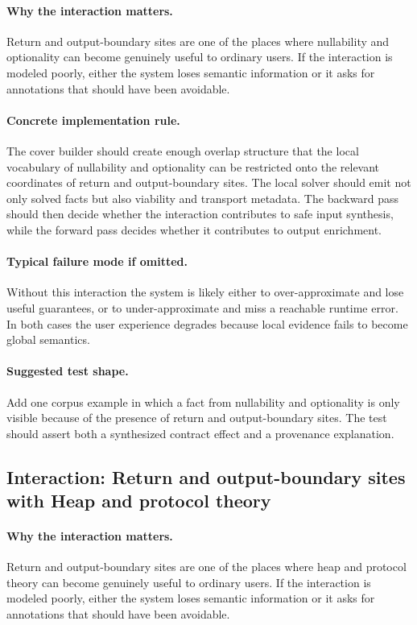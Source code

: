\documentclass[11pt]{report}
\theoremstyle{definition}
\theoremstyle{plain}
\begin{document}
\paragraph{Why the interaction matters.}
Return and output-boundary sites are one of the places where nullability and optionality can become
genuinely useful to ordinary users. If the interaction is modeled poorly,
either the system loses semantic information or it asks for annotations that
should have been avoidable.

\paragraph{Concrete implementation rule.}
The cover builder should create enough overlap structure that the local
vocabulary of nullability and optionality can be restricted onto the relevant
coordinates of return and output-boundary sites. The local solver should emit not only
solved facts but also viability and transport metadata. The backward pass
should then decide whether the interaction contributes to safe input
synthesis, while the forward pass decides whether it contributes to output
enrichment.

\paragraph{Typical failure mode if omitted.}
Without this interaction the system is likely either to over-approximate and
lose useful guarantees, or to under-approximate and miss a reachable runtime
error. In both cases the user experience degrades because local evidence
fails to become global semantics.

\paragraph{Suggested test shape.}
Add one corpus example in which a fact from nullability and optionality is only
visible because of the presence of return and output-boundary sites. The test should
assert both a synthesized contract effect and a provenance explanation.

\subsection{Interaction: Return and output-boundary sites with Heap and protocol theory}

\paragraph{Why the interaction matters.}
Return and output-boundary sites are one of the places where heap and protocol theory can become
genuinely useful to ordinary users. If the interaction is modeled poorly,
either the system loses semantic information or it asks for annotations that
should have been avoidable.
\end{document}
